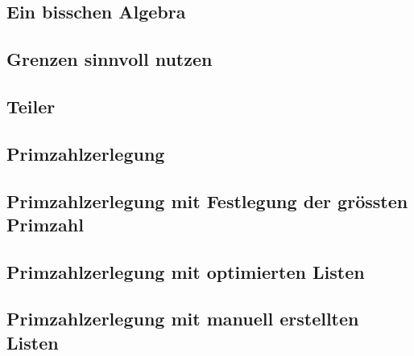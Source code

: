 \documentclass[10pt, fleqn]{article}
\begin{document}
\begin{appendices}
  \subsection{Ein bisschen Algebra}
  
  \subsection{Grenzen sinnvoll nutzen}
  
  \subsection{Teiler}
  
  \subsection{Primzahlzerlegung}
  
  \subsection{Primzahlzerlegung mit Festlegung der grössten Primzahl}
  
  \subsection{Primzahlzerlegung mit optimierten Listen}
  
  \subsection{Primzahlzerlegung mit manuell erstellten Listen}
    

\end{appendices}
\end{document}
